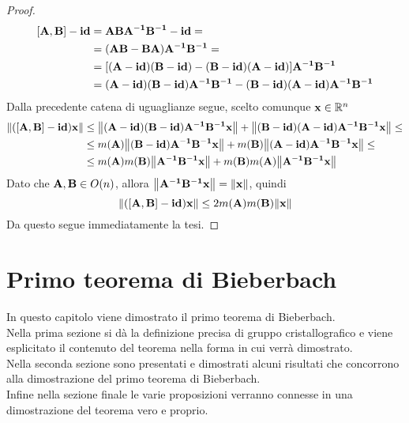 \documentclass[a4paper,11pt,openright,twoside	]{book}
\begin{document}
\begin{proof}
\begin{equation*}
\begin{split}
[\vb{A,B}] - \vb{id} & = \vb{ABA^{-1}B^{-1} - id } = \\
& = \vb{(AB -BA)A^{-1}B^{-1} } = \\
& = [ \vb{ (A-id)(B-id) - (B-id)(A-id)}] \vb{A^{-1}B^{-1}} \\
& = \vb{( A-id)(B-id) A^{-1}B^{-1} -  (B-id)(A-id) A^{-1}B^{-1}}
\end{split}
\end{equation*}  
Dalla precedente catena di uguaglianze segue, scelto comunque $\vb{x} \in \mathbb{R}^n $
 \begin{equation*} 
\begin{split}
\norm{\vb{([A,B] - id )x}} & \leq \norm{\vb{ ( A-id)(B-id) A^{-1}B^{-1}x}} +  \norm{\vb{(B-id)(A-id) A^{-1}B^{-1}x}} \leq \\
& \leq m(\vb{A}) \norm{\vb{(B-id) A^{-1}B^{-1}x}} + m(\vb{B}) \norm{\vb{(A-id) A^{-1}B^{-1}x}} \leq \\ 
& \leq m(\vb{A})m(\vb{B})\norm{\vb{A^{-1}B^{-1}x}} + m(\vb{B})m(\vb{A}) \norm{\vb{A^{-1}B^{-1}x}}
\end{split}
\end{equation*}
Dato che $ \vb{A,B} \in O(n)$, allora $\norm{\vb{A^{-1}B^{-1}x}} = \norm{\vb{x}} $, quindi 
\begin{equation*}
  \norm{\vb{([A,B] - id )x}}  \leq 2m(\vb{A})m(\vb{B})\norm{\vb{x}}
\end{equation*} 
Da questo segue immediatamente la tesi. 
\end{proof}
\chapter{Primo teorema di Bieberbach}
In questo capitolo viene dimostrato il primo teorema di Bieberbach. \\
Nella prima sezione si dà la definizione precisa di gruppo cristallografico e viene esplicitato il contenuto del teorema nella forma in cui verrà dimostrato. \\
Nella seconda sezione sono presentati e dimostrati alcuni risultati che concorrono alla dimostrazione del primo teorema di Bieberbach. \\ 
Infine nella sezione finale le varie proposizioni verranno connesse in una dimostrazione del teorema vero e proprio.  \\
\end{document}
